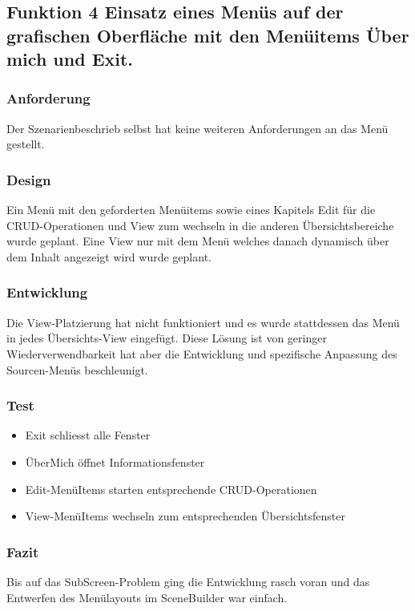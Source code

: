 \subsection[Funktion 4 Menü]{Funktion 4 Einsatz eines Menüs auf der grafischen Oberfläche mit den Menüitems Über mich und Exit.}

\subsubsection{Anforderung}
Der Szenarienbeschrieb selbst hat keine weiteren Anforderungen an das Menü gestellt.

\subsubsection{Design}
Ein Menü mit den geforderten Menüitems sowie eines Kapitels Edit für die CRUD-Operationen und View zum wechseln in die anderen Übersichtsbereiche wurde geplant. Eine View nur mit dem Menü welches danach dynamisch über dem Inhalt angezeigt wird wurde geplant.

\subsubsection{Entwicklung}
Die View-Platzierung hat nicht funktioniert und es wurde stattdessen das Menü in jedes Übersichts-View eingefügt. Diese Lösung ist von geringer Wiederverwendbarkeit hat aber die Entwicklung und spezifische Anpassung des Sourcen-Menüs beschleunigt.

\subsubsection{Test}
\begin{itemize}
	\item Exit schliesst alle Fenster
	\item ÜberMich öffnet Informationsfenster
	\item Edit-MenüItems starten entsprechende CRUD-Operationen
	\item View-MenüItems wechseln zum entsprechenden Übersichtsfenster
\end{itemize}

\subsubsection{Fazit}
Bis auf das SubScreen-Problem ging die Entwicklung rasch voran und das Entwerfen des Menülayouts im SceneBuilder war einfach.